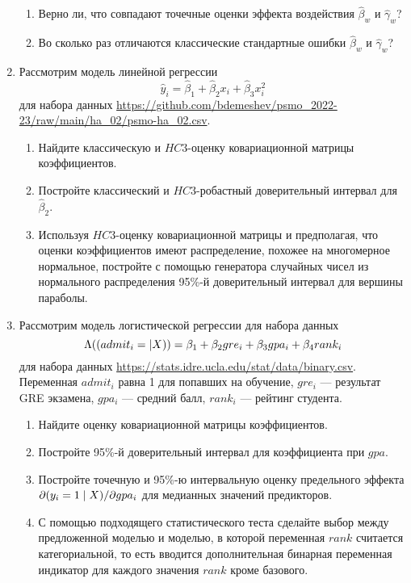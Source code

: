\documentclass[12pt]{article}
\let\P\relax
\DeclareMathOperator{\P}{\mathbb{P}}
\begin{document}
\begin{enumerate}
\begin{enumerate}
    \item Верно ли, что совпадают точечные оценки эффекта воздействия $\hat\beta_w$ и $\hat\gamma_w$?
    \item Во сколько раз отличаются классические стандартные ошибки $\hat\beta_w$ и $\hat\gamma_w$?
\end{enumerate}


\newpage
\item Рассмотрим модель линейной регрессии 
    \[
    \hat y_i = \hat \beta_1 + \hat\beta_2 x_i + \hat\beta_3 x_i^2
    \]
    для набора данных \url{https://github.com/bdemeshev/psmo_2022-23/raw/main/ha_02/psmo-ha_02.csv}.
    \begin{enumerate}
    \item Найдите классическую и $HC3$-оценку ковариационной матрицы коэффициентов. 
    \item Постройте классический и $HC3$-робастный доверительный интервал для $\hat \beta_2$.
    \item Используя $HC3$-оценку ковариационной матрицы и предполагая, 
    что оценки коэффициентов имеют распределение, похожее на многомерное нормальное,
    постройте с помощью генератора случайных чисел из нормального распределения
    95\%-й доверительный интервал для вершины параболы. 
    \end{enumerate}

\item Рассмотрим модель логистической регрессии для набора данных 
\[
\Lambda(\P(admit_i = |X)) = \beta_1 + \beta_2 gre_i + \beta_3 gpa_i + \beta_4 rank_i    
\]
для набора данных \url{https://stats.idre.ucla.edu/stat/data/binary.csv}.
Переменная $admit_i$ равна 1 для попавших на обучение, $gre_i$ — результат GRE экзамена,
$gpa_i$ — средний балл, $rank_i$ — рейтинг студента. 

\begin{enumerate}
    \item Найдите оценку ковариационной матрицы коэффициентов. 
    \item Постройте 95\%-й доверительный интервал для коэффициента при $gpa$. 
    \item Постройте точечную и 95\%-ю интервальную оценку предельного эффекта 
    $\partial \P(y_i = 1\mid X)/\partial gpa_i$ для медианных значений предикторов.
    \item С помощью подходящего статистического теста сделайте выбор между 
    предложенной моделью и моделью, в которой переменная $rank$ считается категориальной, 
    то есть вводится дополнительная бинарная переменная индикатор для каждого значения $rank$ кроме базового. 
\end{enumerate}


\end{enumerate}
\end{document}
